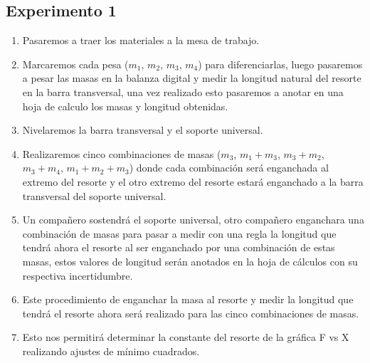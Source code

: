 \documentclass[../main.tex]{subfiles}
\begin{document}
\subsection{Experimento 1}
\begin{enumerate}
    \item Pasaremos a traer los materiales a la mesa de trabajo.
    \item Marcaremos cada pesa ($m_1$, $m_2$, $m_3$, $m_4$) para diferenciarlas, 
    luego pasaremos a pesar las masas en la balanza digital y medir la 
    longitud natural del resorte en la barra transversal, una vez realizado esto pasaremos a anotar en una hoja de calculo los masas y longitud obtenidas.
    \item Nivelaremos la barra transversal y el soporte universal.
    \item Realizaremos cinco combinaciones de masas ($m_3$, $m_1+m_3$, $m_3+m_2$, $m_3+m_4$, $m_1+m_2+m_3$) 
    donde cada combinación será enganchada al extremo del resorte y el otro extremo del resorte estará enganchado 
    a la barra transversal del soporte universal.
    \item Un compañero sostendrá el soporte universal, otro compañero enganchara una combinación de masas para 
    pasar a medir con una regla la longitud que tendrá ahora el resorte al ser enganchado por una combinación de 
    estas masas, estos valores de longitud serán anotados en la hoja de cálculos con su respectiva incertidumbre.
    \item Este procedimiento de enganchar la masa al resorte y medir la longitud que tendrá el resorte 
    ahora será realizado para las cinco combinaciones de masas.
    \item Esto nos permitirá determinar la constante del resorte de la 
    gráfica F vs X realizando ajustes de mínimo cuadrados.
\end{enumerate}
\end{document}
